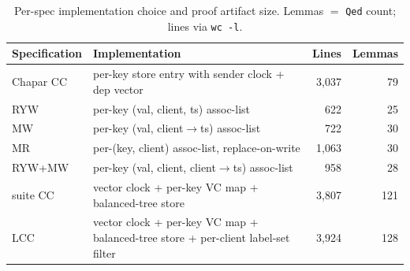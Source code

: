 \begin{table}[h]
\centering
\footnotesize
\setlength{\tabcolsep}{6pt}
\renewcommand{\arraystretch}{1.05}
\caption{Per-spec implementation choice and proof artifact size. Lemmas $=$ \texttt{Qed} count; lines via \texttt{wc -l}.}
\label{tab:synth-artifacts}
\begin{tabular}{l l r r}
\toprule
Specification & Implementation & Lines & Lemmas \\
\midrule
Chapar CC & per-key store entry with sender clock + dep vector & 3{,}037 & 79 \\
RYW       & per-key (val, client, ts) assoc-list & 622 & 25 \\
MW        & per-key (val, client$\to$ts) assoc-list & 722 & 30 \\
MR        & per-(key, client) assoc-list, replace-on-write & 1{,}063 & 30 \\
RYW+MW    & per-key (val, client, client$\to$ts) assoc-list & 958 & 28 \\
\sys{} suite CC & vector clock + per-key VC map + balanced-tree store & 3{,}807 & 121 \\
LCC       & vector clock + per-key VC map + balanced-tree store + per-client label-set filter & 3{,}924 & 128 \\
\bottomrule
\end{tabular}
\end{table}
